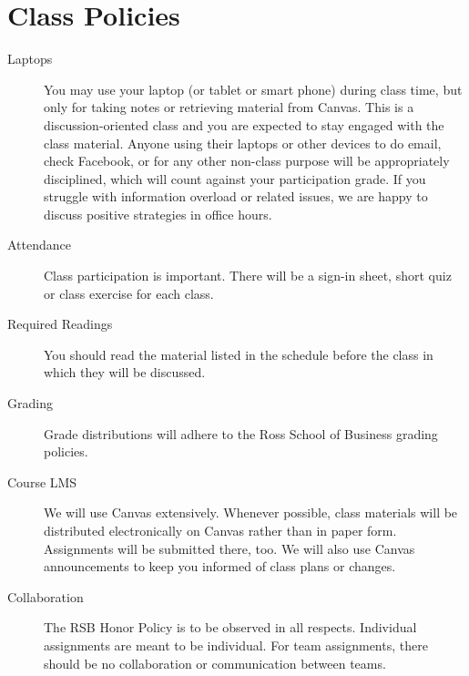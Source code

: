 \documentclass[11pt, letterpaper, twoside]{memoir}\usepackage{knitr}
\begin{document}
\section{Class Policies}

\begin{description}
\item [Laptops] You may use your laptop (or tablet or smart phone) during class time, but only for taking notes or retrieving material from Canvas. This is a discussion-oriented class and you are expected to stay engaged with the class material. Anyone using their laptops or other devices to do email, check Facebook, or for any other non-class purpose will be appropriately disciplined, which will count against your participation grade. If you struggle with information overload or related issues, we are happy to discuss positive strategies in office hours.

\item [Attendance] Class participation is important. There will be a sign-in sheet, short quiz or class exercise for each class.

\item [Required Readings] You should read the material listed in the schedule before the class in which they will be discussed.

\item [Grading] Grade distributions will adhere to the Ross School of Business grading policies.

\item [Course LMS] We will use Canvas extensively. Whenever possible, class materials will be distributed electronically on Canvas rather than in paper form. Assignments will be submitted there, too. We will also use Canvas announcements to keep you informed of class plans or changes.

\item [Collaboration] The RSB Honor Policy is to be observed in all respects. Individual assignments are meant to be individual. For team assignments, there should be no collaboration or communication between teams.


\end{description}
\end{document}
